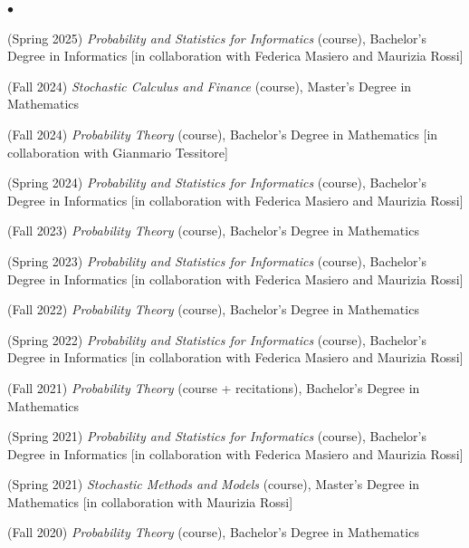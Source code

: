 \documentclass[a4paper,11pt,oneside]{amsart}
\newenvironment{myitemize}{%
\begin{list}{$\bullet$}%
 	{%
	\setlength{\itemsep}{0.3em}%
	\setlength{\topsep}{0.3em}%
	\setlength{\partopsep}{0em}%
	\setlength{\parsep}{0em}%
	\setlength{\parskip}{0em}%
	\setlength\leftmargin{1.5em}%
	\setlength\labelwidth{1.1em}%
	\setlength{\labelsep}{0.4em}%
	}%
	}%
{\end{list}}
\renewenvironment{itemize}{
\begin{myitemize}}%
{\end{myitemize}}
\begin{document}
\begin{itemize}
\item (Spring 2025)
\textit{Probability and Statistics for Informatics} (course),
Bachelor's Degree in Informatics
[in collaboration with Federica Masiero and Maurizia Rossi]

\item (Fall 2024)
\textit{Stochastic Calculus and Finance} (course),
Master's Degree in Mathematics

\item (Fall 2024)
\textit{Probability Theory} (course),
Bachelor's Degree in Mathematics
[in collaboration with Gianmario Tessitore]

\item (Spring 2024)
\textit{Probability and Statistics for Informatics} (course),
Bachelor's Degree in Informatics
[in collaboration with Federica Masiero and Maurizia Rossi]

\item (Fall 2023)
\textit{Probability Theory} (course),
Bachelor's Degree in Mathematics

\item (Spring 2023)
\textit{Probability and Statistics for Informatics} (course),
Bachelor's Degree in Informatics
[in collaboration with Federica Masiero and Maurizia Rossi]

\item (Fall 2022)
\textit{Probability Theory} (course),
Bachelor's Degree in Mathematics

\item (Spring 2022)
\textit{Probability and Statistics for Informatics} (course),
Bachelor's Degree in Informatics
[in collaboration with Federica Masiero and Maurizia Rossi]

\item (Fall 2021)
\textit{Probability Theory} (course + recitations),
Bachelor's Degree in Mathematics

\item (Spring 2021)
\textit{Probability and Statistics for Informatics} (course),
Bachelor's Degree in Informatics
[in collaboration with Federica Masiero and Maurizia Rossi]

\item (Spring 2021)
\textit{Stochastic Methods and Models} (course),
Master's Degree in Mathematics
[in collaboration with Maurizia Rossi]

\item (Fall 2020)
\textit{Probability Theory} (course),
Bachelor's Degree in Mathematics


\end{itemize}
\end{document}
